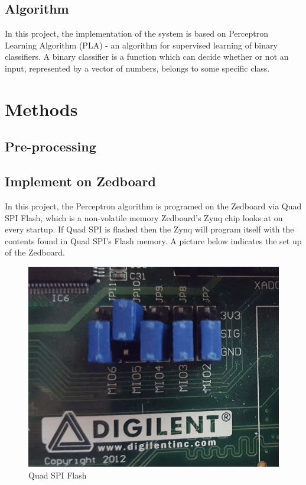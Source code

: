\documentclass[12pt, a4paper, oneside]{article}
\begin{document}
    	\subsection{Algorithm}
    		In this project, the implementation of the system is based on Perceptron Learning Algorithm (PLA) - an algorithm for supervised learning of binary classifiers. A binary classifier is a function which can decide whether or not an input, represented by a vector of numbers, belongs to some specific class. 
    		
    \section{Methods}
    	\subsection{Pre-processing}
    		
    
    	\subsection{Implement on Zedboard}
    		In this project, the Perceptron algorithm is programed on the Zedboard via Quad SPI Flash, which is a non-volatile memory Zedboard's Zynq chip looks at on every startup. If Quad SPI is flashed then the Zynq will program itself with the contents found in Quad SPI's Flash memory. A picture below indicates the set up of the Zedboard.
    		\begin{figure}[tbh!]
    			\begin{center}
    				\includegraphics[scale=0.6]{QSPI.png}
    				\caption{Quad SPI Flash}
    				\label{fig:Quad SPI Flash}
    			\end{center}
    		\end{figure}
    		
\end{document}
